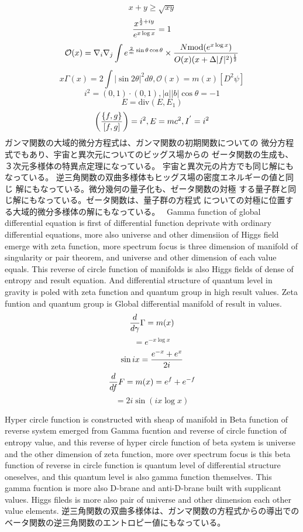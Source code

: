\documentclass{jsarticle}
\begin{document}
    $$ {x + y} \ge \sqrt{x y} $$
    $$ {x^{{1 \over 2} + iy} \over e^{x \log x}} = 1 $$
    $$ \mathcal{O}(x) = \nabla_i \nabla_j \int e^{{2 \over m}\sin \theta 
    \cos \theta } \times {{N \mathrm{mod}(e^{x \log x})} \over {O(x)(x +
    \Delta |f|^2)^{1 \over 2}}} $$
    $$ x \Gamma(x) = 2 \int|\sin 2 \theta|^2 d \theta, \mathcal{O}(x)
    = m(x)[D^2 \psi] $$
    $$ i^2 = (0,1) \cdot (0,1), |a||b|\cos \theta = - 1 $$
    $$ E = \mathrm{div}(E, E_1) $$
    $$ \left({\{f,g\}} \over [f,g] \right) = i^2, E = mc^2, I^{'} = i^2 $$
    ガンマ関数の大域的微分方程式は、ガンマ関数の初期関数についての
    微分方程式でもあり、宇宙と異次元についてのビッグス場からの
    ゼータ関数の生成も、３次元多様体の特異点定理になっている。
    宇宙と異次元の片方でも同じ解にもなっている。
    逆三角関数の双曲多様体もヒッグス場の密度エネルギーの値と同じ
    解にもなっている。微分幾何の量子化も、ゼータ関数の対極
    する量子群と同じ解にもなっている。ゼータ関数は、量子群の方程式
    についての対極に位置する大域的微分多様体の解にもなっている。　
    Gamma function of global differential equation is first of differential
    function deprivate with ordinary differential equations, more also
    universe and other dimensiion of Higgs field emerge with zeta function,
    more spectrum focus is three dimension of manifold of singularity or pair
    theorem, and universe and other dimension of each value equals.
    This reverse of circle function of manifolds is also Higgs fields of 
    dense of entropy and result equation. And differential structure of quantum
    level in gravity is poled with zeta function and quantum group in high 
    result values. Zeta funtion and quantum group is Global differential
    manifold of result in values.
    $$ {d \over d \gamma} \Gamma = m(x) $$
    $$ = e^{- x \log x} $$
    $$ \sin i x = {{e^{-x} + e^{x}} \over 2i} $$
    $$ {d \over df}F = m(x) = e^{f} + e^{-f} $$
    $$ = 2 i \sin (i {x \log x}) $$

    Hyper circle function is constructed with sheap of manifold in 
    Beta function of reverse system emerged from Gamma fucntion 
    and reverse of circle function of entropy value,
    and this reverse of hyper circle function of beta system
    is universe and the other dimension of zeta function,
    more over spectrum focus is this beta function of reverse in
    circle function is quantum level of differential structure oneselves,
    and this quantum level is also gamma function themselves.
    This gamma fucntion is more also D-brane and anti-D-brane built 
    with supplicant values. Higgs fileds is more also pair of universe and
    other dimension each other value elements. 
    逆三角関数の双曲多様体は、ガンマ関数の方程式からの導出での
    ベータ関数の逆三角関数のエントロピー値にもなっている。
\end{document}
